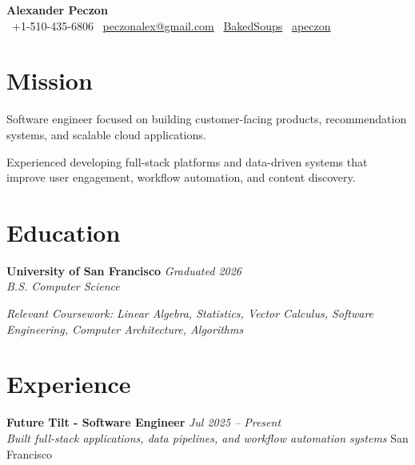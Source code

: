 \documentclass[a4paper,11pt]{article}
\makeatletter
\newcommand{\resumeSubheading}[4]{%
\vspace{1mm}
\textbf{#1} \hfill \textit{\footnotesize #4} \\
\textit{\footnotesize #3} \hfill \footnotesize #2
\vspace{1mm}
}
\newcommand{\name}{Alexander Peczon}
\newcommand{\phone}{510-435-6806}
\newcommand{\emaila}{peczonalex@gmail.com}
\makeatother
\begin{document}
\vspace{-8mm}

\begin{center}
\textbf{\Huge \name} \\
\vspace{1mm}
\footnotesize
\faPhone\ +1-\phone \hspace{6mm}
\faEnvelope\ \href{mailto:\emaila}{\emaila} \hspace{6mm}
\faGithub\ \href{https://github.com/BakedSoups}{BakedSoups} \hspace{6mm}
\faLinkedin\ \href{https://linkedin.com/in/apeczon}{apeczon}
\end{center}

\vspace{-13mm}

\section{\textbf{Mission}}
\vspace{-1mm}

{\footnotesize
Software engineer focused on building customer-facing products, recommendation systems, and scalable cloud applications.

Experienced developing full-stack platforms and data-driven systems that improve user engagement, workflow automation, and content discovery.

}
\vspace{-6mm}

\section{\textbf{Education}}
\vspace{-.45mm}

\resumeSubheading
{University of San Francisco}{}{B.S. Computer Science}{Graduated 2026}

\textit{Relevant Coursework: Linear Algebra, Statistics, Vector Calculus, Software Engineering, Computer Architecture, Algorithms}

\vspace{-4mm}
\vspace{-2mm}

\section{\textbf{Experience}}
\resumeSubheading
{Future Tilt - Software Engineer}{San Francisco}
{Built full-stack applications, data pipelines, and workflow automation systems}{Jul 2025 -- Present}
\end{document}
